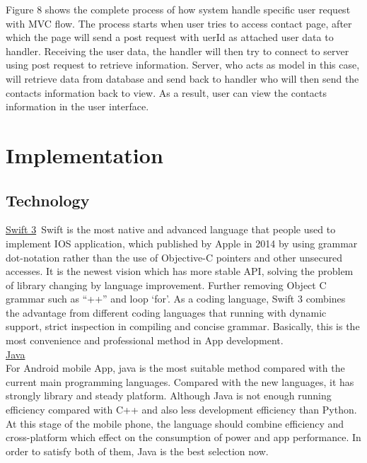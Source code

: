 \documentclass{article}
\begin{document}
\begin{enumerate}
		Figure 8 shows the complete process of how system handle specific user request with MVC flow. The process starts when user tries to access contact page, after which the page will send a post request with uerId as attached user data to handler. Receiving the user data, the handler will then try to connect to server using post request to retrieve information. Server, who acts as model in this case, will retrieve data from database and send back to handler who will then send the contacts information back to view. As a result, user can view the contacts information in the user interface. \\
		
		
		
	
	\section{Implementation}
	
	\subsection{Technology}
	
	\underline{Swift 3}\
	Swift is the most native and advanced language that people used to implement IOS application, which published by Apple in 2014 by using grammar dot-notation rather than the use of Objective-C pointers and other unsecured accesses. It is the newest vision which has more stable API, solving the problem of library changing by language improvement. Further removing Object C grammar such as “++” and loop ‘for’. As a coding language, Swift 3 combines the advantage from different coding languages that running with dynamic support, strict inspection in compiling and concise grammar. Basically, this is the most convenience and professional method in App development.\\
	
	\underline{Java}\\ 
	For Android mobile App, java is the most suitable method compared with the current main programming languages. Compared with the new languages, it has strongly library and steady platform. Although Java is not enough running efficiency compared with C++ and also less development efficiency than Python. At this stage of the mobile phone, the language should combine efficiency and cross-platform which effect on the consumption of power and app performance. In order to satisfy both of them, Java is the best selection now.\\ 
	

\end{enumerate}
\end{document}
